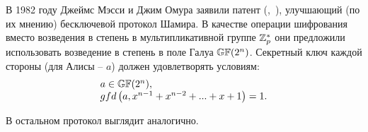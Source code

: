 В 1982 году Джеймс Мэсси и Джим Омура заявили патент (,~\cite{Massey:Omura:1986}), улучшающий (по их мнению) бесключевой протокол Шамира. В качестве операции шифрования вместо возведения в степень в мультипликативной группе $\mathbb{Z}_p^*$ они предложили использовать возведение в степень в поле Галуа $\mathbb{GF}(2^n)$. Секретный ключ каждой стороны (для Алисы -- $a$) должен удовлетворять условиям:
\[ \begin{array}{l}
 a \in \mathbb{GF}(2^n), \\
 gfd \left( a, x^{ n-1 } + x^{ n-2 } + ... + x + 1 \right) = 1. \\
\end{array} \]

В остальном протокол выглядит аналогично.

